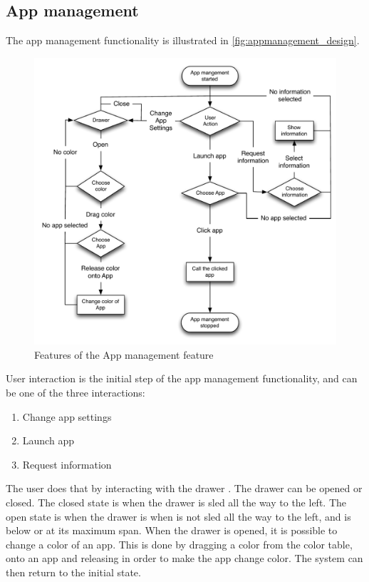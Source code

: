 \subsection{App management}
\label{design:app_manangement}
The app management functionality is illustrated in \autoref{fig:appmanagement_design}. 
\begin{figure}[h]
	\centering
	\includegraphics[width=1\textwidth]{gfx/appmanagement.pdf}
	\caption{Features of the App management feature}
	\label{fig:appmanagement_design}
\end{figure}
User interaction is the initial step of the app management functionality, and can be one of the three interactions:

\begin{enumerate}
	\item Change app settings
	\item Launch app
	\item Request information
\end{enumerate}

The user does that by interacting with the drawer .
The drawer can be opened or closed.
The closed state is when the drawer is sled all the way to the left.
The open state is when the drawer is when is not sled all the way to the left, and is below or at its maximum span.
When the drawer is opened, it is possible to change a color of an app.
This is done by dragging a color from the color table, onto an app and releasing in order to make the app change color.
The system can then return to the initial state.

